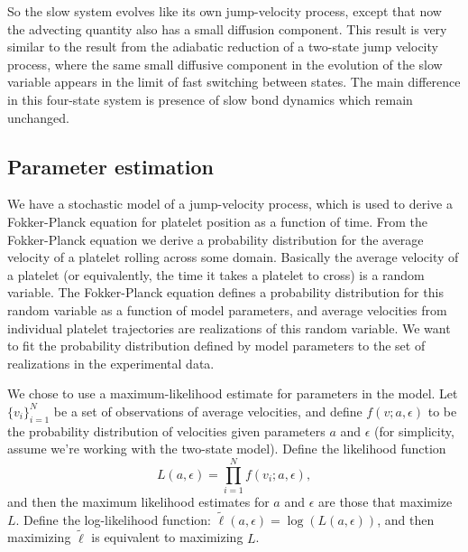 So the slow system evolves like its own jump-velocity process, except
that now the advecting quantity also has a small diffusion
component. This result is very similar to the result from the adiabatic
reduction of a two-state jump velocity process, where the same small
diffusive component in the evolution of the slow variable appears in the
limit of fast switching between states. The main difference in this
four-state system is presence of slow bond dynamics which remain
unchanged.

\subsection{Parameter estimation}
\label{sec:parameter-estimation}


We have a stochastic model of a jump-velocity process, which is used
to derive a Fokker-Planck equation for platelet position as a function
of time. From the Fokker-Planck equation we derive a probability
distribution for the average velocity of a platelet rolling across
some domain. Basically the average velocity of a platelet (or
equivalently, the time it takes a platelet to cross) is a random
variable. The Fokker-Planck equation defines a probability
distribution for this random variable as a function of model
parameters, and average velocities from individual platelet
trajectories are realizations of this random variable. We want to fit
the probability distribution defined by model parameters to the set of
realizations in the experimental data.

We chose to use a maximum-likelihood estimate for parameters in the
model. Let $\{v_i\}_{i=1}^N$ be a set of observations of average
velocities, and define $f(v;a, \epsilon)$ to be the probability
distribution of velocities given parameters $a$ and $\epsilon$ (for
simplicity, assume we're working with the two-state model). Define the
likelihood function
\begin{equation}
  \label{eq:likelihood}
  L(a, \epsilon) = \prod_{i=1}^N f(v_i; a, \epsilon),
\end{equation}
and then the maximum likelihood estimates for $a$ and $\epsilon$ are
those that maximize $L$. Define the log-likelihood function:
$\tilde{\ell}(a, \epsilon) = \log(L(a, \epsilon))$, and then
maximizing $\tilde{\ell}$ is equivalent to maximizing $L$.

